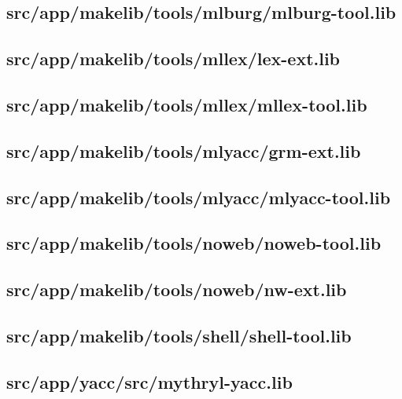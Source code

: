 \subsection{src/app/makelib/tools/mlburg/mlburg-tool.lib}


\subsection{src/app/makelib/tools/mllex/lex-ext.lib}


\subsection{src/app/makelib/tools/mllex/mllex-tool.lib}


\subsection{src/app/makelib/tools/mlyacc/grm-ext.lib}


\subsection{src/app/makelib/tools/mlyacc/mlyacc-tool.lib}


\subsection{src/app/makelib/tools/noweb/noweb-tool.lib}


\subsection{src/app/makelib/tools/noweb/nw-ext.lib}


\subsection{src/app/makelib/tools/shell/shell-tool.lib}


\subsection{src/app/yacc/src/mythryl-yacc.lib}


